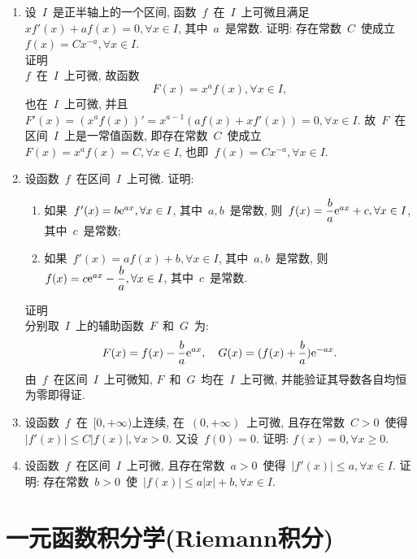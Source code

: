 \documentclass[UTF8,a4paper,20pt]{article}
\begin{document}
\begin{enumerate}
\item 设~$I$~是正半轴上的一个区间, 函数~$f$~在~$I$~上可微且满足~$xf'(x)+af(x)=0, \forall x\in I$, 其中~$a$~是常数. 证明: 存在常数~$C$~使成立~$f(x)=Cx^{-a}, \forall x\in I$.\\
{\heiti 证明}\\
$f$~在~$I$~上可微, 故函数
\[F(x)=x^af(x), \forall x\in I,\]
也在~$I$~上可微, 并且~$F'(x)=(x^af(x))'=x^{a-1}(af(x)+xf'(x))=0, \forall x\in I$. 故~$F$~在区间~$I$~上是一常值函数, 即存在常数~$C$~使成立~$F(x)=x^af(x)=C, \forall x\in I$, 也即~$f(x)=Cx^{-a}, \forall x\in I$.

\item 设函数~$f$~在区间~$I$~上可微. 证明: 
	\begin{enumerate}[(1)]
	\item 如果~$f'(x)=b\mathrm{e}^{ax}, \forall x\in I$, 其中~$a, b$~是常数, 则~$f(x)=\dfrac{b}{a}\mathrm{e}^{ax}+c, \forall x\in I$, 其中~$c$~是常数;
	\item 如果~$f'(x)=af(x)+b, \forall x\in I$, 其中~$a, b$~是常数, 则~$f(x)=c\mathrm{e}^{ax}-\dfrac{b}{a}, \forall x\in I$, 其中~$c$~是常数.
	\end{enumerate}
{\heiti 证明}\\
分别取~$I$~上的辅助函数~$F$~和~$G$~为:
\[ F(x)=f(x)-\dfrac{b}{a}\mathrm{e}^{ax}, \quad G(x)=(f(x)+\dfrac{b}{a})\mathrm{e}^{-ax}.\]
由~$f$~在区间~$I$~上可微知, $F$~和~$G$~均在~$I$~上可微, 并能验证其导数各自均恒为零即得证.

\item 设函数~$f$~在~$[0,+\infty)$上连续, 在~$(0,+\infty)$~上可微, 且存在常数~$C>0$~使得~$|f'(x)|\leqslant C|f(x)|, \forall x>0$. 又设~$f(0)=0$. 证明: $f(x)=0, \forall x\geqslant 0$.

\item 设函数~$f$~在区间~$I$~上可微, 且存在常数~$a>0$~使得~$|f'(x)|\leqslant a, \forall x\in I$. 证明: 存在常数~$b>0$~使~$|f(x)|\leqslant a|x|+b, \forall x\in I$.
\end{enumerate}

\clearpage
\section{一元函数积分学(Riemann积分)}
\end{document}
